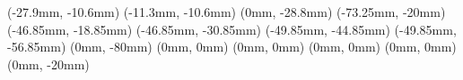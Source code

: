 \JoinCoffins \result \topBox
\JoinCoffins {} \badge[r, b](-27.9mm, -10.6mm)
\JoinCoffins {} \pku[l, b](-11.3mm, -10.6mm)
\JoinCoffins {} \headingText[hc, b](0mm, -28.8mm)
\JoinCoffins {} \titleText[l, t](-73.25mm, -20mm)
\JoinCoffins {} \chineseTitleTextA[l, t](-46.85mm, -18.85mm)
\JoinCoffins {} \chineseTitleTextB[l, t](-46.85mm, -30.85mm)
\JoinCoffins {} \englishTitleTextA[l, t](-49.85mm, -44.85mm)
\JoinCoffins {} \englishTitleTextB[l, t](-49.85mm, -56.85mm)
\JoinCoffins {} \nameText[hc, t](0mm, -80mm)
\JoinCoffins {} \studentIDText[hc, t](0mm, 0mm)
\JoinCoffins {} \schoolText[hc, t](0mm, 0mm)
\JoinCoffins {} \majorText[hc, t](0mm, 0mm)
\JoinCoffins {} \advisorText[hc, t](0mm, 0mm)
\JoinCoffins {} \dateText[hc, t](0mm, -20mm)


\thispagestyle{empty}
\noindent\TypesetCoffin \result
\restoregeometry